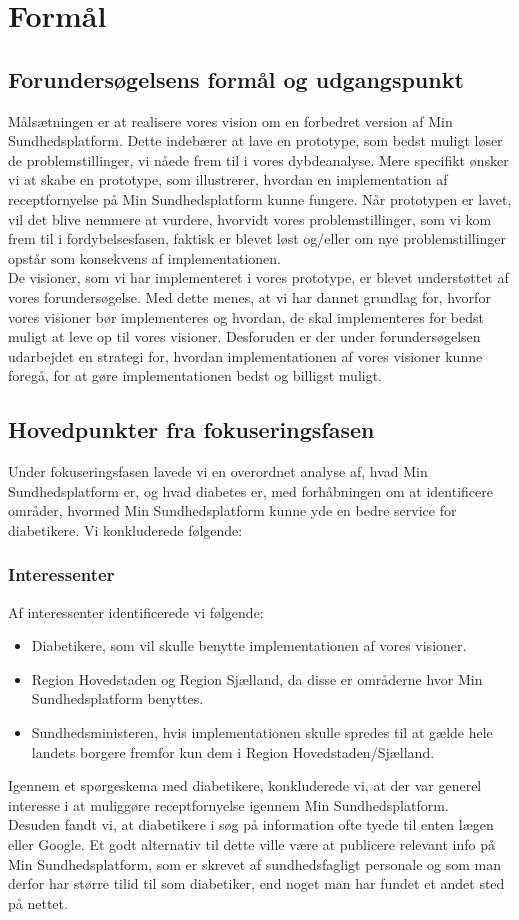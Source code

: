 \section{Formål}
\subsection{Forundersøgelsens formål og udgangspunkt}
Målsætningen er at realisere vores vision om en forbedret version af Min Sundhedsplatform. Dette indebærer at lave en prototype, som bedst muligt løser de problemstillinger, vi nåede frem til i vores dybdeanalyse. Mere specifikt ønsker vi at skabe en prototype, som illustrerer, hvordan en implementation af receptfornyelse på Min Sundhedsplatform kunne fungere. Når prototypen er lavet, vil det blive nemmere at vurdere, hvorvidt vores problemstillinger, som vi kom frem til i fordybelsesfasen, faktisk er blevet løst og/eller om nye problemstillinger opstår som konsekvens af implementationen.\\
De visioner, som vi har implementeret i vores prototype, er blevet understøttet af vores forundersøgelse. Med dette menes, at vi har dannet grundlag for, hvorfor vores visioner bør implementeres og hvordan, de skal implementeres for bedst muligt at leve op til vores visioner. Desforuden er der under forundersøgelsen udarbejdet en strategi for, hvordan implementationen af vores visioner kunne foregå, for at gøre implementationen bedst og billigst muligt. 
\subsection{Hovedpunkter fra fokuseringsfasen}
Under fokuseringsfasen lavede vi en overordnet analyse af, hvad Min Sundhedsplatform er, og hvad diabetes er, med forhåbningen om at identificere områder, hvormed Min Sundhedsplatform kunne yde en bedre service for diabetikere. Vi konkluderede følgende:
\subsubsection{Interessenter}
Af interessenter identificerede vi følgende:
\begin{itemize}
\item Diabetikere, som vil skulle benytte implementationen af vores visioner.
\item Region Hovedstaden og Region Sjælland, da disse er områderne hvor Min Sundhedsplatform benyttes.
\item Sundhedsministeren, hvis implementationen skulle spredes til at gælde hele landets borgere fremfor kun dem i Region Hovedstaden/Sjælland.
\end{itemize}
Igennem et spørgeskema med diabetikere, konkluderede vi, at der var generel interesse i at muliggøre receptfornyelse igennem Min Sundhedsplatform.\\
Desuden fandt vi, at diabetikere i søg på information ofte tyede til enten lægen eller Google. Et godt alternativ til dette ville være at publicere relevant info på Min Sundhedsplatform, som er skrevet af sundhedsfagligt personale og som man derfor har større tilid til som diabetiker, end noget man har fundet et andet sted på nettet. 
